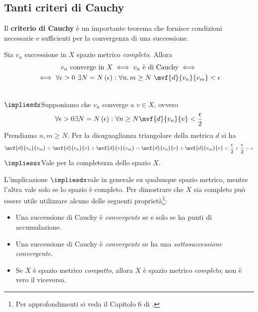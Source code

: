 \subsection{Tanti criteri di Cauchy}\label{criteriodicauchy}
Il \textbf{criterio di Cauchy} è un importante teorema che fornisce condizioni necessarie e sufficienti per la convergenza di una successione.
\begin{theorema}
		Sia $v_n$ successione in $X$ spazio metrico \textit{completo}. Allora
	\begin{multline}
		v_n\text{ converge in }X \iff v_n\text{ è di Cauchy}\iff\\
		\iff\forall \epsilon >0\ \exists N=N\left(\epsilon\right)\colon\forall n,m\geq N\ \mvf{d}{v_n}{v_m}<\epsilon
	\end{multline}
\end{theorema}
\begin{demonstration}~{}\\
	$\impliesdx$Supponiamo che $v_n$ converge a $v\in X$, ovvero
	\begin{equation*}
		\forall \epsilon>0\exists N=N\left(\epsilon\right)\colon\forall n\geq N\mvf{d}{v_n}{v}<\frac{\epsilon}{2}
	\end{equation*}
	Prendiamo $n,m\geq N$. Per la disuguaglianza triangolare della metrica $d$ si ha
	\begin{equation*}
		\mvf{d}{v_n}{v_m}<\mvf{d}{v_n}{v}+\mvf{d}{v}{v_m}=\mvf{d}{v_n}{v}+\mvf{d}{v_m}{v}<\frac{\epsilon}{2}+\frac{\epsilon}{2}=\epsilon
	\end{equation*}
	$\impliessx$Vale per la completezza dello spazio $X$.
\end{demonstration}
\begin{observe}
	L'implicazione $\impliesdx$vale in generale su qualunque spazio metrico, mentre l'altra vale solo se lo spazio è completo. Per dimostrare che $X$ sia completo può essere utile utilizzare alcune delle seguenti proprietà\footnote{Per approfondimenti si veda il Capitolo 6 di \cite{antucabertolotti:2021manualozzogeometria}.}:
	\begin{itemize}
		\item Una successione di Cauchy è \textit{convergente} se e solo se ha punti di accumulazione.
		\item Una successione di Cauchy è \textit{convergente} se ha una \textit{sottosuccessione convergente}.
		\item Se $X$ è spazio metrico \textit{compatto}, allora $X$ è spazio metrico \textit{completo}; non è vero il viceversa.
	\end{itemize}
\end{observe}
